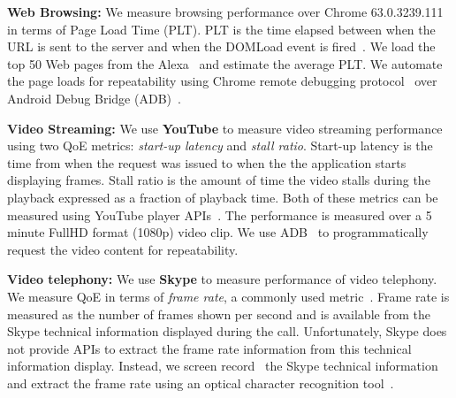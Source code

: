 
\noindent\textbf{Web Browsing:} We measure browsing performance over Chrome 63.0.3239.111 in terms of Page Load Time (PLT). 
PLT is the time elapsed between when the URL is sent to the server and when the DOMLoad event is fired~\cite{wang2013demystifying}. We load the top 50 Web pages from the Alexa~\cite{alexa} and estimate the average PLT. We automate the page loads for repeatability using Chrome remote debugging protocol~\cite{ggle} over Android Debug Bridge (ADB)~\cite{adb}.

\noindent\textbf{Video Streaming:} We use {\bf YouTube} to measure video streaming performance using two QoE metrics: {\em start-up latency} and {\em stall ratio}. 
Start-up latency is the time from when the request was issued to when the the application starts displaying frames. Stall ratio is the  amount of time the video stalls during the playback expressed as a fraction
of playback time.
Both of these metrics can be measured using YouTube player APIs~\cite{youtubeapi}. %
%
The performance is measured over a 5 minute FullHD format (1080p) video clip. We use ADB~\cite{adb} to programmatically request the video content for repeatability.%

\noindent\textbf{Video telephony:} We use {\bf Skype} to measure performance of video telephony. We measure QoE in terms of {\em frame rate}, a commonly used metric~\cite{yu2014can}.
Frame rate is measured as the number of frames shown per second and is available from the Skype technical information displayed during the call. Unfortunately, Skype does not provide APIs to extract the frame rate information from this technical information display.
Instead, we screen record~\cite{azscreen} the Skype technical information and extract the frame rate using an optical character recognition tool~\cite{ocr-tesseract}. 

